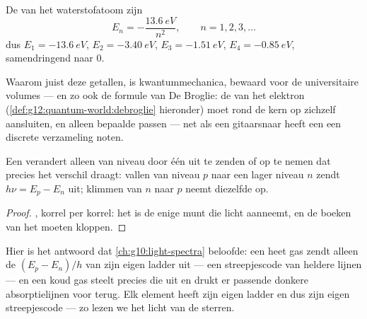 \begin{proposition}[De waterstofladder]\label{prop:g12:quantum-world:hydrogen}
De  van het waterstofatoom zijn
\[
E_n = -\frac{\qty{13.6}{eV}}{n^2}, \qquad n = 1, 2, 3, \dots
\]
dus $E_1 = \qty{-13.6}{eV}$, $E_2 = \qty{-3.40}{eV}$,
$E_3 = \qty{-1.51}{eV}$, $E_4 = \qty{-0.85}{eV}$, samendringend naar $0$.
\end{proposition}
\admitted

\begin{remark}\label{rem:g12:quantum-world:ladder-origin}
Waarom juist deze getallen, is kwantummechanica, bewaard voor de
universitaire volumes --- en zo ook de formule van De Broglie: de 
van het elektron (\cref{def:g12:quantum-world:debroglie} hieronder) moet rond
de kern op zichzelf aansluiten, en alleen bepaalde  passen --- net
als een gitaarsnaar heeft een  een discrete verzameling noten.
\end{remark}

\begin{theorem}\label{thm:g12:quantum-world:transition}
Een  verandert alleen van niveau door één  uit te zenden of op te
nemen dat precies het verschil draagt: vallen van niveau $p$ naar een lager
niveau $n$ zendt $h\nu = E_p - E_n$ uit; klimmen van $n$ naar $p$ neemt
diezelfde  op.
\end{theorem}

\begin{proof}
, korrel per korrel: het  is de enige munt die licht
aanneemt, en de boeken van het  moeten kloppen.
\end{proof}

\begin{remark}\label{rem:g12:quantum-world:lines}
Hier is het antwoord dat \cref{ch:g10:light-spectra} beloofde: een heet gas
zendt alleen de  $(E_p - E_n)/h$ van zijn eigen ladder uit --- een
streepjescode van heldere lijnen --- en een koud gas steelt precies die
 uit  en drukt er passende donkere absorptielijnen voor
terug. Elk element heeft zijn eigen ladder en dus zijn eigen streepjescode ---
zo lezen we het licht van de sterren.
\end{remark}

